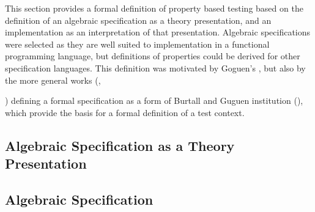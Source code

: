 
This section provides a formal definition of property based testing
based on the definition of an algebraic specification as a theory presentation,
and an implementation as an interpretation of that presentation.
Algebraic specifications were selected as they are well suited to 
implementation in a functional programming language,
but definitions of properties could be derived for other specification languages.
This definition was motivated by Goguen's \cite{GoguenIBM1977},
but also by the more general works (\cite{BernotGaudelMarre1991'}, { \cite{Bernot1991})
defining a formal specification as a form of Burtall and Guguen institution (\cite{BurstallGoguen1977}),
which provide the basis for a formal definition of a test context.

\subsection{Algebraic Specification as a Theory Presentation}\label{formal_spec}



\subsection{Algebraic Specification}

}
